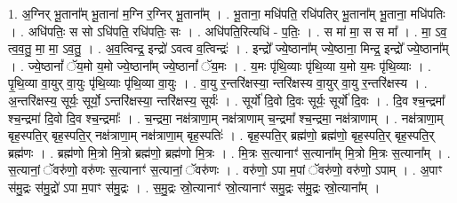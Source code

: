 \documentclass[17pt]{extarticle}
\begin{document}
1. अ॒ग्निर् भू॒ताना᳚म् भू॒ताना॑ म॒ग्नि र॒ग्निर् भू॒ताना᳚म् । . भू॒ताना॒ मधि॑पति॒ रधि॑पतिर् भू॒ताना᳚म् भू॒ताना॒ मधि॑पतिः । . अधि॑पतिः॒ स सो ऽधि॑पति॒ रधि॑पतिः॒ सः । . अधि॑पति॒रित्यधि॑ - प॒तिः॒ । . स मा॑ मा॒ स स मा᳚ । . मा॒ ऽव॒ त्व॒व॒तु॒ मा॒ मा॒ ऽव॒तु॒ । . अ॒व॒त्विन्द्र॒ इन्द्रो॑ ऽवत्व व॒त्विन्द्रः॑ । . इन्द्रो᳚ ज्ये॒ष्ठाना᳚म् ज्ये॒ष्ठाना॒ मिन्द्र॒ इन्द्रो᳚ ज्ये॒ष्ठाना᳚म् । . ज्ये॒ष्ठानां᳚ ॅय॒मो य॒मो ज्ये॒ष्ठाना᳚म् ज्ये॒ष्ठानां᳚ ॅय॒मः । . य॒मः पृ॑थि॒व्याः पृ॑थि॒व्या य॒मो य॒मः पृ॑थि॒व्याः । . पृ॒थि॒व्या वा॒युर् वा॒युः पृ॑थि॒व्याः पृ॑थि॒व्या वा॒युः । . वा॒यु र॒न्तरि॑क्षस्या॒ न्तरि॑क्षस्य वा॒युर् वा॒यु र॒न्तरि॑क्षस्य । . अ॒न्तरि॑क्षस्य॒ सूर्यः॒ सूर्यो॒ ऽन्तरि॑क्षस्या॒ न्तरि॑क्षस्य॒ सूर्यः॑ । . सूर्यो॑ दि॒वो दि॒वः सूर्यः॒ सूर्यो॑ दि॒वः । . दि॒व श्च॒न्द्रमा᳚ श्च॒न्द्रमा॑ दि॒वो दि॒व श्च॒न्द्रमाः᳚ । . च॒न्द्रमा॒ नक्ष॑त्राणा॒म् नक्ष॑त्राणाम् च॒न्द्रमा᳚ श्च॒न्द्रमा॒ नक्ष॑त्राणाम् । . नक्ष॑त्राणा॒म् बृह॒स्पति॒र् बृह॒स्पति॒र् नक्ष॑त्राणा॒म् नक्ष॑त्राणा॒म् बृह॒स्पतिः॑ । . बृह॒स्पति॒र् ब्रह्म॑णो॒ ब्रह्म॑णो॒ बृह॒स्पति॒र् बृह॒स्पति॒र् ब्रह्म॑णः । . ब्रह्म॑णो मि॒त्रो मि॒त्रो ब्रह्म॑णो॒ ब्रह्म॑णो मि॒त्रः । . मि॒त्रः स॒त्यानाꣳ॑ स॒त्याना᳚म् मि॒त्रो मि॒त्रः स॒त्याना᳚म् । . स॒त्यानां॒ ॅवरु॑णो॒ वरु॑णः स॒त्यानाꣳ॑ स॒त्यानां॒ ॅवरु॑णः । . वरु॑णो॒ ऽपा म॒पां ॅवरु॑णो॒ वरु॑णो॒ ऽपाम् । . अ॒पाꣳ स॑मु॒द्रः स॑मु॒द्रो॑ ऽपा म॒पाꣳ स॑मु॒द्रः । . स॒मु॒द्रः स्रो॒त्यानाꣳ॑ स्रो॒त्यानाꣳ॑ समु॒द्रः स॑मु॒द्रः स्रो॒त्याना᳚म् । \newline
\end{document}
